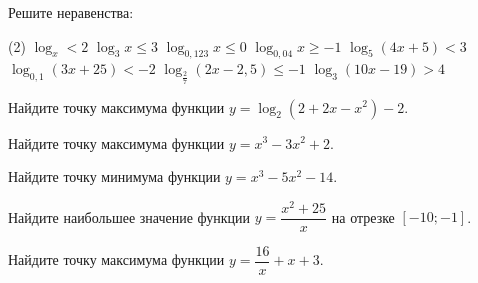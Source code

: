 \begin{class}[number=4]
	\begin{listofex}
		\item Решите неравенства: %
		\begin{tasks}(2)
			\task \( \log_x<2 \)
			\task \( \log_3x\le3 \)
			\task \( \log_{0,123}x \le 0 \)
			\task \( \log_{0,04}x \ge -1 \)
			\task \( \log_5 (4x+5) < 3 \)
			\task \( \log_{0,1}(3x+25)<-2 \)
			\task \( \log_{\tfrac{2}{7}}(2x-2,5)\le -1 \)
			\task \( \log_3 (10x-19)>4 \)
		\end{tasks}
	\end{listofex}
\end{class}

\begin{homework}[number=2]
	\begin{listofex}
		\item Найдите точку максимума функции \(y=\log_2 (2+2x-x^2)-2\).
		
		\item Найдите точку максимума функции \(y=x^3-3x^2+2\).
		\item Найдите точку минимума функции \(y=x^3-5x^2-14\).
		
		\item Найдите наибольшее значение функции \(y=\dfrac{ x^2+25 }{ x }\) на отрезке \(\left[ -10;-1 \right]\).
		\item Найдите точку максимума функции \(y=\dfrac{ 16 }{ x }+x+3\).
		

\end{listofex}
\end{homework}
